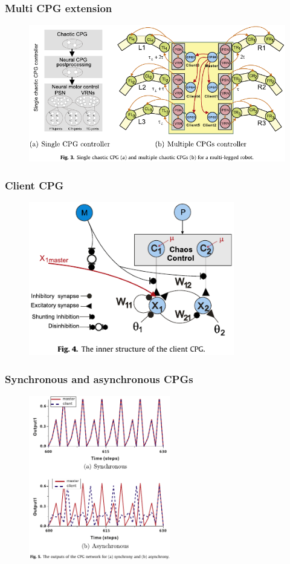 \documentclass{beamer}
\begin{document}
\begin{frame}
\frametitle{Multi CPG extension}
\begin{figure}
\center
\includegraphics[width=1\textwidth]{figs/multi-CPG-extension.pdf}
\end{figure}
\end{frame}

\begin{frame}
\frametitle{Client CPG}
\begin{figure}
\center
\includegraphics[width=0.8\textwidth]{figs/client-CPG.pdf}
\end{figure}
\end{frame}

\begin{frame}
\frametitle{Synchronous and asynchronous CPGs}
    \vspace*{-0.4cm}
\begin{figure}
\center
\includegraphics[width=0.55\textwidth]{figs/synchrony-asynchrony.pdf}
\end{figure}
\end{frame}
\end{document}
